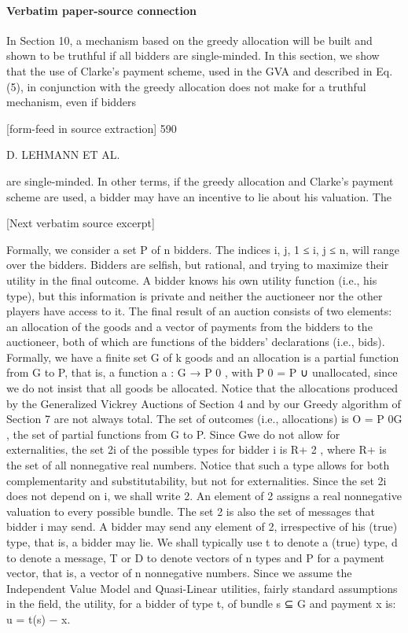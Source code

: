 \documentclass[10pt]{article}
\begin{document}
\paragraph{Verbatim paper-source connection}
\begin{ReviewVerbatim}
In Section 10, a mechanism based on the greedy allocation will be built and shown
to be truthful if all bidders are single-minded. In this section, we show that the use of
Clarke’s payment scheme, used in the GVA and described in Eq. (5), in conjunction
with the greedy allocation does not make for a truthful mechanism, even if bidders


[form-feed in source extraction]
590

D. LEHMANN ET AL.

are single-minded. In other terms, if the greedy allocation and Clarke’s payment
scheme are used, a bidder may have an incentive to lie about his valuation. The

[Next verbatim source excerpt]

Formally, we consider a set P of n bidders. The indices i, j, 1 ≤ i, j ≤ n, will
range over the bidders. Bidders are selfish, but rational, and trying to maximize their
utility in the final outcome. A bidder knows his own utility function (i.e., his type),
but this information is private and neither the auctioneer nor the other players have
access to it. The final result of an auction consists of two elements: an allocation
of the goods and a vector of payments from the bidders to the auctioneer, both of
which are functions of the bidders’ declarations (i.e., bids). Formally, we have a
finite set G of k goods and an allocation is a partial function from G to P, that is, a
function a : G → P 0 , with P 0 = P ∪ {unallocated}, since we do not insist that all
goods be allocated. Notice that the allocations produced by the Generalized Vickrey
Auctions of Section 4 and by our Greedy algorithm of Section 7 are not always
total. The set of outcomes (i.e., allocations) is O = P 0G , the set of partial functions
from G to P. Since Gwe do not allow for externalities, the set 2i of the possible types
for bidder i is R+ 2 , where R+ is the set of all nonnegative real numbers. Notice
that such a type allows for both complementarity and substitutability, but not for
externalities. Since the set 2i does not depend on i, we shall write 2. An element
of 2 assigns a real nonnegative valuation to every possible bundle. The set 2 is
also the set of messages that bidder i may send. A bidder may send any element of
2, irrespective of his (true) type, that is, a bidder may lie. We shall typically use t
to denote a (true) type, d to denote a message, T or D to denote vectors of n types
and P for a payment vector, that is, a vector of n nonnegative numbers.
Since we assume the Independent Value Model and Quasi-Linear utilities, fairly
standard assumptions in the field, the utility, for a bidder of type t, of bundle s ⊆ G
and payment x is:
u = t(s) − x.


\end{ReviewVerbatim}
\end{document}
